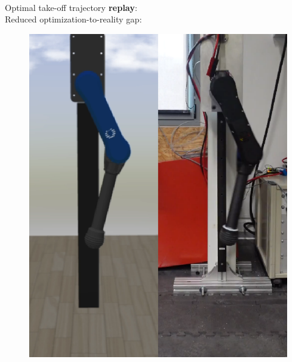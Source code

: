 \documentclass[aspectratio=169]{beamer}
\begin{document}
\begin{frame}
\begin{multicols}{2}
\vspace{0.5cm}\hphantom{e}\\
Optimal take-off trajectory \textbf{replay}:
\vfill\null
\columnbreak
\vspace{0.5cm}\hphantom{e}\\
Reduced optimization-to-reality gap:
\begin{figure}
    \centering
    \includegraphics[width=0.5\columnwidth]{beamer_imgs/opt2sim.pdf}
\end{figure}
\end{multicols}
\end{frame}

\end{document}
